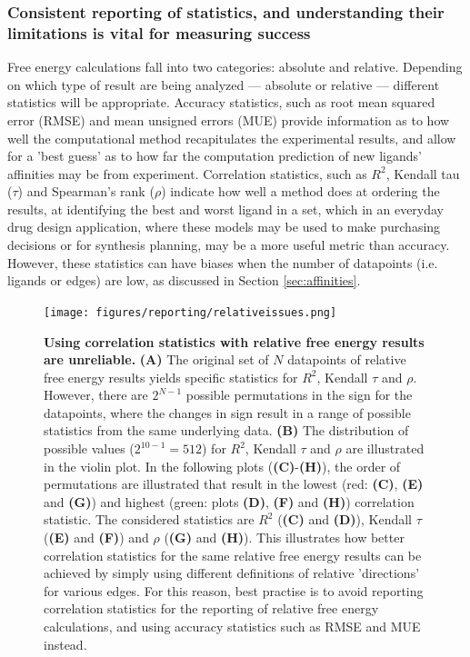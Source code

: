 \documentclass[9pt,bestpractices,pubversion]{livecoms}
\begin{document}
\subsubsection{Consistent reporting of statistics, and understanding their limitations is vital for measuring success}
\label{sec:statistical_analysis}
Free energy calculations fall into two categories: absolute and relative. Depending on which type of result are being analyzed --- absolute or relative --- different statistics will be appropriate. Accuracy statistics, such as root mean squared error (RMSE) and mean unsigned errors (MUE) provide information as to how well the computational method recapitulates the experimental results, and allow for a 'best guess' as to how far the computation prediction of new ligands' affinities may be from experiment. Correlation statistics, such as $R^{2}$, Kendall tau ($\tau$) and Spearman's rank ($\rho$) indicate how well a method does at ordering the results, at identifying the best and worst ligand in a set, which in an everyday drug design application, where these models may be used to make purchasing decisions or for synthesis planning, may be a more useful metric than accuracy. However, these statistics can have biases when the number of datapoints (i.e. ligands or edges) are low, as discussed in Section \ref{sec:affinities}.



\begin{figure}[!ht]
    \texttt{[image: figures/reporting/relativeissues.png]}
    \caption{\textbf{Using correlation statistics with relative free energy results are unreliable.} 
    \textbf{(A)} The original set of $N$ datapoints of relative free energy results yields specific statistics for $R^2$, Kendall $\tau$ and $\rho$. However, there are $2^{N-1}$ possible permutations in the sign for the datapoints, where the changes in sign result in a range of possible statistics from the same underlying data. \textbf{(B)} The distribution of possible values ($2^{10-1} = 512$) for $R^2$, Kendall $\tau$ and $\rho$ are illustrated in the violin plot. 
    In the following plots (\textbf{(C)}-\textbf{(H)}), the order of permutations are illustrated that result in the lowest (red: \textbf{(C)}, \textbf{(E)} and \textbf{(G)}) and highest (green: plots \textbf{(D)}, \textbf{(F)} and \textbf{(H)}) correlation statistic. 
    The considered statistics are $R^2$ (\textbf{(C)} and \textbf{(D)}), Kendall $\tau$ (\textbf{(E)} and \textbf{(F)}) and $\rho$ (\textbf{(G)} and \textbf{(H)}).
    This illustrates how better correlation statistics for the same relative free energy results can be achieved by simply using different definitions of relative 'directions' for various edges. 
    For this reason, best practise is to avoid reporting correlation statistics for the reporting of relative free energy calculations, and using accuracy  statistics such as RMSE and MUE instead.}
    \label{fig:changing-corr}
\end{figure}
\end{document}
